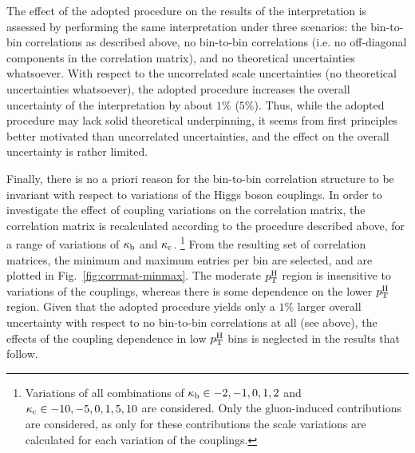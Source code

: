 The effect of the adopted procedure on the results of the interpretation is assessed by performing the same interpretation under three scenarios: the bin-to-bin correlations as described above, no bin-to-bin correlations (i.e. no off-diagonal components in the correlation matrix), and no theoretical uncertainties whatsoever.
% 
With respect to the uncorrelated scale uncertainties (no theoretical uncertainties whatsoever), the adopted procedure increases the overall uncertainty of the interpretation by about $1\%$ ($5\%$).
% 
Thus, while the adopted procedure may lack solid theoretical underpinning, it seems from first principles better motivated than uncorrelated uncertainties, and the effect on the overall uncertainty is rather limited.


Finally, there is no a priori reason for the bin-to-bin correlation structure to be invariant with respect to variations of the Higgs boson couplings.
% 
In order to investigate the effect of coupling variations on the correlation matrix, the correlation matrix is recalculated according to the procedure described above, for a range of variations of $\kappa_{\mathrm{b}}$ and $\kappa_{\mathrm{c}}$.%
% 
\footnote{%
Variations of all combinations of $\kappa_{\mathrm{b}} \in -2, -1, 0, 1, 2$ and $\kappa_{\mathrm{c}} \in -10, -5, 0, 1, 5, 10$ are considered.
% 
Only the gluon-induced contributions are considered, as only for these contributions the scale variations are calculated for each variation of the couplings.
}
% 
From the resulting set of correlation matrices, the minimum and maximum entries per bin are selected, and are plotted in Fig.~\ref{fig:corrmat-minmax}.
% 
The moderate $p_\mathrm{T}^\mathrm{H}$ region is insensitive to variations of the couplings, whereas there is some dependence on the lower $p_\mathrm{T}^\mathrm{H}$ region.
% 
Given that the adopted procedure yields only a $1\%$ larger overall uncertainty with respect to no bin-to-bin correlations at all (see above), the effects of the coupling dependence in low $p_\mathrm{T}^\mathrm{H}$ bins is neglected in the results that follow.


